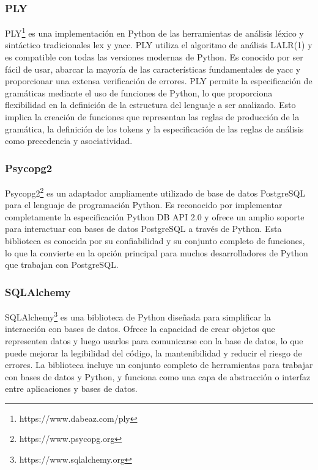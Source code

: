 \subsubsection{PLY}

PLY\footnote{https://www.dabeaz.com/ply} es una implementación en Python de las 
herramientas de análisis léxico y sintáctico 
tradicionales lex y yacc. PLY utiliza el algoritmo de análisis LALR(1) y es 
compatible con todas las versiones modernas de Python. Es conocido por ser fácil de usar,
abarcar la mayoría de las características fundamentales de yacc y proporcionar una extensa verificación de errores. 
PLY permite la especificación de gramáticas 
mediante el uso de funciones de Python, lo que proporciona flexibilidad en la definición de la estructura del 
lenguaje a ser analizado. Esto implica la creación de funciones que representan las reglas de producción de la 
gramática, la definición de los tokens y la especificación de las reglas de 
análisis como precedencia y asociatividad.

\subsubsection{Psycopg2}

Psycopg2\footnote{https://www.psycopg.org} es un adaptador ampliamente utilizado de base de datos PostgreSQL 
para el lenguaje de programación 
Python. Es reconocido por implementar completamente la especificación Python DB API 2.0 y ofrece un amplio 
soporte para interactuar con bases de datos PostgreSQL a través de Python. Esta biblioteca es conocida por 
su confiabilidad y su conjunto completo de funciones, lo que la convierte en la opción principal para muchos 
desarrolladores de Python que trabajan con PostgreSQL.

\subsubsection{SQLAlchemy}

SQLAlchemy\footnote{https://www.sqlalchemy.org} es una biblioteca de Python diseñada para simplificar la 
interacción con bases de datos. Ofrece la 
capacidad de crear objetos que representen datos y luego usarlos para comunicarse con la base de datos, lo que 
puede mejorar la legibilidad del código, la mantenibilidad y reducir el riesgo de errores. La biblioteca incluye 
un conjunto completo de herramientas para trabajar con bases de datos y Python, y funciona como una capa de 
abstracción o interfaz entre aplicaciones y bases de datos. 

